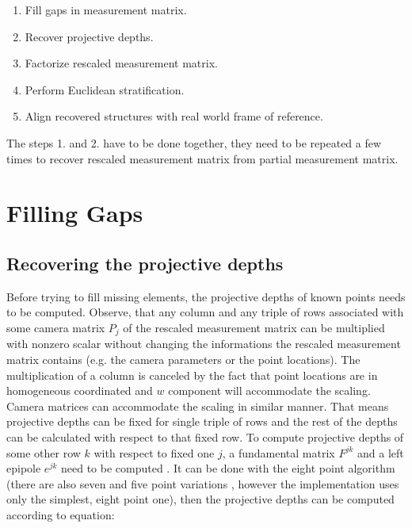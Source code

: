 \documentclass[12pt]{article}
\begin{document}
\begin{enumerate}
\item Fill gaps in measurement matrix.
\item Recover projective depths.
\item Factorize rescaled measurement matrix.
\item Perform Euclidean stratification.
\item Align recovered structures with real world frame of reference.
\end{enumerate}

The steps 1. and 2. have to be done together, they need to be repeated a few
times to recover rescaled measurement matrix from partial measurement matrix.

\section{Filling Gaps}
\subsection{Recovering the projective depths}

Before trying to fill missing elements, the projective depths of known points
needs to be computed. Observe, that any column and any triple of rows associated
with some camera matrix  $P_j$ of the rescaled measurement matrix can be
multiplied with nonzero scalar without  changing the informations the rescaled
measurement matrix contains (e.g. the camera parameters  or the point
locations). The multiplication of a column is canceled by the fact that point
locations are in homogeneous coordinated and $w$ component will accommodate the
scaling.  Camera matrices can accommodate the scaling in similar manner. That
means projective depths  can be fixed for single triple of rows and the rest of
the depths can be calculated with  respect to that fixed row. To compute
projective depths of some other row $k$ with respect to   fixed one $j$, a
fundamental matrix $F^{jk}$ and a left epipole $e^{jk}$ need to be computed
\cite{sturm96}. It can be done with the eight point algorithm \cite{hartley95}
(there are   also seven and five point variations \cite{stewenius06}, however
the implementation uses only    the simplest, eight point one), then the
projective depths can be computed according to     equation:

\end{document}
